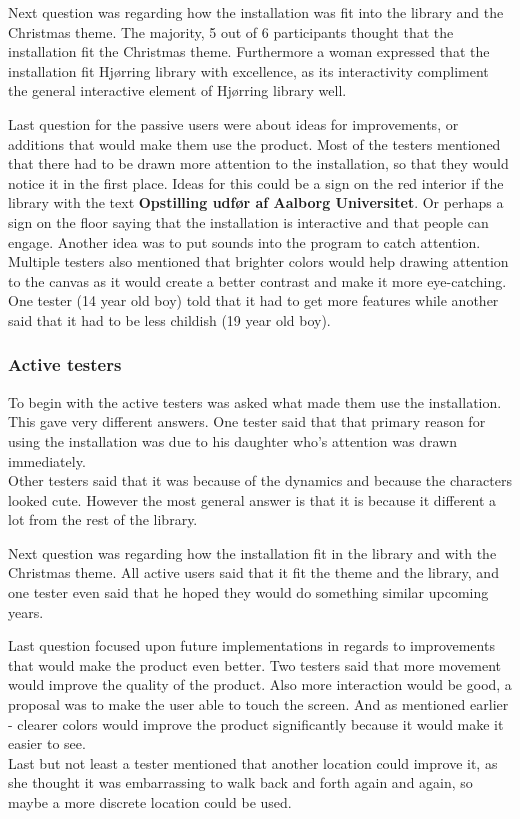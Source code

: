 Next question was regarding how the installation was fit into the library and the Christmas theme. The majority, 5 out of 6 participants thought that the installation fit the Christmas theme. Furthermore a woman expressed that the installation fit Hj{\o}rring library with excellence, as its interactivity compliment the general interactive element of Hj{\o}rring library well. 

Last question for the passive users were about ideas for improvements, or additions that would make them use the product.
Most of the testers mentioned that there had to be drawn more attention to the installation, so that they would notice it in the first place. Ideas for this could be a sign on the red interior if the library with the text \textbf{Opstilling udf{\o}r af Aalborg Universitet}. Or perhaps a sign on the floor saying that the installation is interactive and that people can engage. Another idea was to put sounds into the program to catch attention. Multiple testers also mentioned that brighter colors would help drawing attention to the canvas as it would create a better contrast and make it more eye-catching. 
One tester (14 year old boy) told that it had to get more features while another said that it had to be less childish (19 year old boy).

\subsubsection{Active testers}
To begin with the active testers was asked what made them use the installation. This gave very different answers. One tester said that that primary reason for using the installation was due to his daughter who's attention was drawn immediately.\\
Other testers said that it was because of the dynamics and because the characters looked cute. However the most general answer is that it is because it different a lot from the rest of the library.

Next question was regarding how the installation fit in the library and with the Christmas theme. All active users said that it fit the theme and the library, and one tester even said that he hoped they would do something similar upcoming years.

Last question focused upon future implementations in regards to improvements that would make the product even better. Two testers said that more movement would improve the quality of the product. Also more interaction would be good, a proposal was to make the user able to touch the screen.
And as mentioned earlier - clearer colors would improve the product significantly because it would make it easier to see.\\
Last but not least a tester mentioned that another location could improve it, as she thought it was embarrassing to walk back and forth again and again, so maybe a more discrete location could be used.

